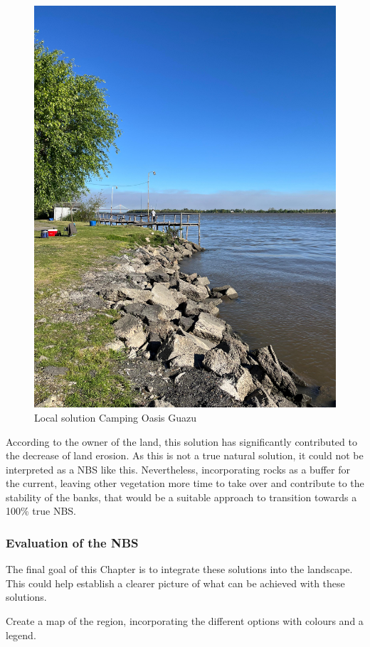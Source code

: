 \begin{figure}[H]
    \centering
    \includegraphics[width=0.5\linewidth]{figures/appendixE/rocks.jpg}
    \caption{Local solution Camping Oasis Guazu}
    \label{fig:local solution Camping Oasis Guazu}
\end{figure}

According to the owner of the land, this solution has significantly contributed to the decrease of land erosion. As this is not a true natural solution, it could not be interpreted as a NBS like this. Nevertheless, incorporating rocks as a buffer for the current, leaving other vegetation more time to take over and contribute to the stability of the banks, that would be a suitable approach to transition towards a 100\% true NBS.






\subsubsection{Evaluation of the NBS}

The final goal of this Chapter is to integrate these solutions into the landscape. This could help establish a clearer picture of what can be achieved with these solutions.

Create a map of the region, incorporating the different options with colours and a legend.


